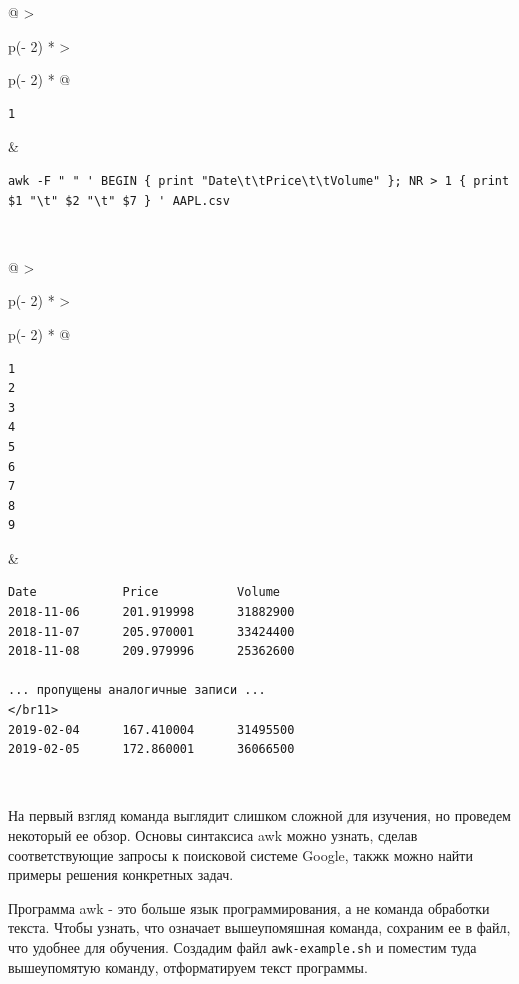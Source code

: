 \documentclass{report}
\begin{document}
\begin{longtable}[]{@{}
  >{\raggedright\arraybackslash}p{(\columnwidth - 2\tabcolsep) * }
  >{\raggedright\arraybackslash}p{(\columnwidth - 2\tabcolsep) * }@{}}
\toprule
\endhead
\begin{minipage}[t]{\linewidth}\raggedright
\begin{verbatim}
1
\end{verbatim}
\end{minipage} & \begin{minipage}[t]{\linewidth}\raggedright
\begin{verbatim}
awk -F " " ' BEGIN { print "Date\t\tPrice\t\tVolume" }; NR > 1 { print $1 "\t" $2 "\t" $7 } ' AAPL.csv
\end{verbatim}
\end{minipage} \\ \addlinespace
\bottomrule
\end{longtable}

\begin{longtable}[]{@{}
  >{\raggedright\arraybackslash}p{(\columnwidth - 2\tabcolsep) * }
  >{\raggedright\arraybackslash}p{(\columnwidth - 2\tabcolsep) * }@{}}
\toprule
\endhead
\begin{minipage}[t]{\linewidth}\raggedright
\begin{verbatim}
1
2
3
4
5
6
7
8
9
\end{verbatim}
\end{minipage} & \begin{minipage}[t]{\linewidth}\raggedright
\begin{verbatim}
Date            Price           Volume
2018-11-06      201.919998      31882900
2018-11-07      205.970001      33424400
2018-11-08      209.979996      25362600

... пропущены аналогичные записи ...
</br11>
2019-02-04      167.410004      31495500
2019-02-05      172.860001      36066500
\end{verbatim}
\end{minipage} \\ \addlinespace
\bottomrule
\end{longtable}

На первый взгляд команда выглядит слишком сложной для изучения, но
проведем некоторый ее обзор. Основы синтаксиса awk можно узнать, сделав
соответствующие запросы к поисковой системе Google, такжк можно найти
примеры решения конкретных задач.

Программа awk - это больше язык программирования, а не команда обработки
текста. Чтобы узнать, что означает вышеупомяшная команда, сохраним ее в
файл, что удобнее для обучения. Создадим файл \texttt{awk-example.sh} и
поместим туда вышеупомятую команду, отформатируем текст программы.
\end{document}
